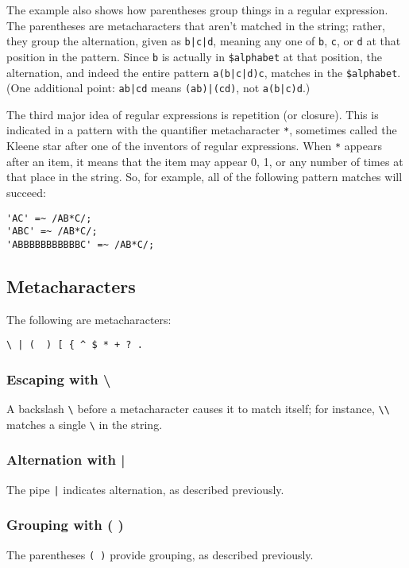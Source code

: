 The example also shows how parentheses group things in a regular expression. The parentheses are metacharacters that aren't matched in the string; rather, they group the alternation, given as \verb=b|c|d=, meaning any one of \verb|b|, \verb|c|, or \verb|d| at that position in the pattern. Since \verb|b| is actually in \verb|$alphabet| at that position, the alternation, and indeed the entire pattern \verb=a(b|c|d)c=, matches in the \verb|$alphabet|. (One additional point: \verb=ab|cd= means \verb=(ab)|(cd)=, not \verb=a(b|c)d=.)

The third major idea of regular expressions is repetition (or closure).  This is indicated in a pattern with the quantifier metacharacter \verb|*|, sometimes called the Kleene star after one of the inventors of regular expressions. When \verb|*| appears after an item, it means that the item may appear 0, 1, or any number of times at that place in the string. So, for example, all of the following pattern matches will succeed:

\begin{lstlisting}
'AC' =~ /AB*C/;
'ABC' =~ /AB*C/;
'ABBBBBBBBBBBC' =~ /AB*C/;
\end{lstlisting}

\subsection{Metacharacters}
The following are metacharacters:

\begin{lstlisting}
\ | (  ) [ { ^ $ * + ? .
\end{lstlisting}

\subsubsection{Escaping with \textbackslash}
A backslash \verb|\| before a metacharacter causes it to match itself; for instance, \verb|\\| matches a single \verb|\| in the string.

\subsubsection{Alternation with |}
The pipe \verb=|= indicates alternation, as described previously.

\subsubsection{Grouping with ( )}
The parentheses \verb|( )| provide grouping, as described previously.

